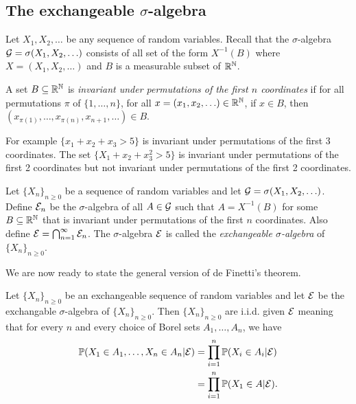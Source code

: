 \subsection{The exchangeable $\sigma$-algebra}
Let $X_1,X_2,\ldots$ be any sequence of random variables. Recall that the $\sigma$-algebra ${\mathcal{G}} = \sigma(X_1,X_2,\ldots)$ consists of all set of the form $X^{-1}(B)$ where $X=(X_1,X_2,\ldots)$ and $B$ is a measurable subset of ${\mathbb R}^{{\mathbb N}}$.
\begin{definition}
    A set $B \subseteq {\mathbb R}^{{\mathbb N}}$ is \emph{invariant under permutations of the first $n$ coordinates} if for all permutations $\pi$ of $\{1,\ldots,n\}$, for all $x=(x_1,x_2,\ldots) \in {\mathbb R}^{{\mathbb N}}$, if $x \in B$, then $(x_{\pi(1)},\ldots, x_{\pi(n)}, x_{n+1},\ldots) \in B$.
\end{definition}
For example $\{x_1+x_2+x_3 > 5\}$ is invariant under permutations of the first 3 coordinates. The set $\{X_1+x_2+x_3^2 > 5\}$ is invariant under permutations of the first 2 coordinates but not invariant under permutations of the first 2 coordinates.
\begin{definition}
    Let $\{X_n\}_{n\ge 0}$ be a sequence of random variables and let ${\mathcal{G}} = \sigma(X_1,X_2,\ldots)$. Define ${\mathcal{E}}_n$ be the $\sigma$-algebra of all $A \in {\mathcal{G}}$ such that $A = X^{-1}(B)$ for some $B \subseteq {\mathbb R}^{{\mathbb N}}$ that is invariant under permutations of the first $n$ coordinates. Also define ${\mathcal{E}} = \bigcap_{n=1}^\infty {\mathcal{E}}_n$. The $\sigma$-algebra ${\mathcal{E}}$ is called the \emph{exchangeable $\sigma$-algebra} of $\{X_n\}_{n \ge 0}$.
\end{definition}
We are now ready to state the general version of de Finetti's theorem.
\begin{theorem}
    Let $\{X_n\}_{n \ge 0}$ be an exchangeable sequence of random variables and let ${\mathcal{E}}$ be the exchangable $\sigma$-algebra of $\{X_n\}_{n \ge 0}$. Then $\{X_n\}_{n \ge 0}$ are i.i.d. given ${\mathcal{E}}$ meaning that for every $n$ and every choice of Borel sets $A_1,\ldots,A_n$, we have
    \begin{align*}
        {\mathbb{P}}(X_1 \in A_1,\ldots,X_n \in A_n|{\mathcal{E}}) &=\prod_{i=1}^n {\mathbb{P}}(X_i \in A_i |{\mathcal{E}})\\
        &=\prod_{i=1}^n {\mathbb{P}}(X_1 \in A|{\mathcal{E}}).
    \end{align*}
\end{theorem}
